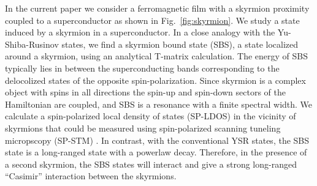 \documentclass[twocolumn,showpacs,floatfix,nofootinbib,longbibliography]{revtex4-1}
\begin{document}
In the current paper we consider a ferromagnetic film with a skyrmion proximity coupled to a superconductor as shown in Fig.~\ref{fig:skyrmion}. We study a state induced by a skyrmion in a superconductor. In a close analogy with the Yu-Shiba-Rusinov \cite{Yu,Shiba,Rusinov} states, we find a skyrmion bound state (SBS), a state localized around a skyrmion, using an analytical T-matrix calculation. The energy of SBS typically lies in between the superconducting bands corresponding to the delocolized states of the opposite spin-polarization. Since skyrmion is a complex object with spins in all directions the spin-up and spin-down sectors of the Hamiltonian are coupled, and SBS is a resonance with a finite spectral width. We calculate a spin-polarized local density of states (SP-LDOS) in the vicinity of skyrmions that could be measured using spin-polarized scanning tuneling micropscopy (SP-STM) \cite{Romming2013,Bergmann2014,Romming2015}.  In contrast, with the conventional YSR states, the SBS state is a long-ranged state with a powerlaw decay. Therefore, in the presence of a second skyrmion, the SBS states will interact and give a strong \cite{Yao2014} long-ranged ``Casimir'' interaction \cite{Shytov2009} between the skyrmions.




 







\end{document}
